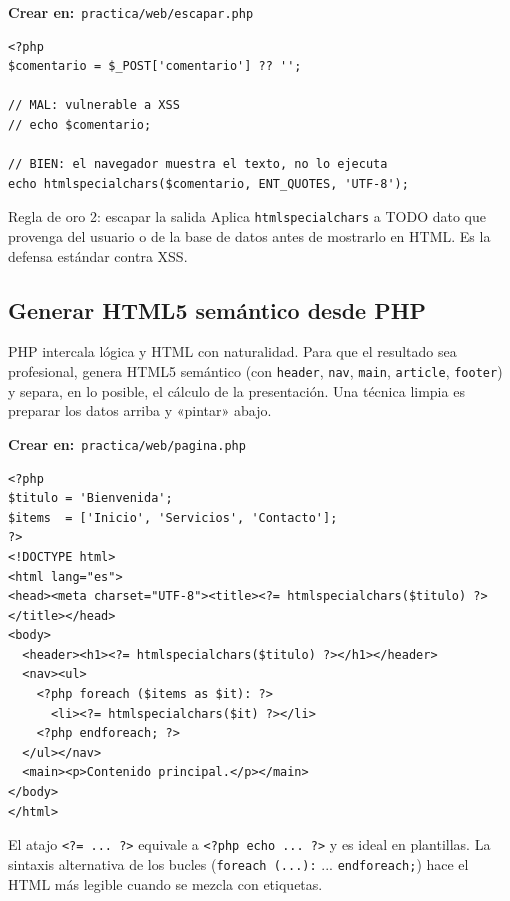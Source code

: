\documentclass[11pt]{article}
\begin{document}
{\small\color{phpazulo}\textbf{Crear en:}~}\texttt{practica/\allowbreak{}web/\allowbreak{}escapar.\allowbreak{}php}\par\nobreak\vspace{-1pt}
\begin{cajacodigo}
\begin{lstlisting}[style=php]
<?php
$comentario = $_POST['comentario'] ?? '';

// MAL: vulnerable a XSS
// echo $comentario;

// BIEN: el navegador muestra el texto, no lo ejecuta
echo htmlspecialchars($comentario, ENT_QUOTES, 'UTF-8');
\end{lstlisting}
\end{cajacodigo}
\vspace{2pt}
\begin{cajatip}{Regla de oro 2: escapar la salida}
Aplica \texttt{htmlspecialchars} a TODO dato que provenga del usuario o de la base de datos antes de mostrarlo en HTML. Es la defensa estándar contra XSS.\par
\end{cajatip}
\subsection{Generar HTML5 semántico desde PHP}
PHP intercala lógica y HTML con naturalidad. Para que el resultado sea profesional, genera HTML5 semántico (con \texttt{header}, \texttt{nav}, \texttt{main}, \texttt{article}, \texttt{footer}) y separa, en lo posible, el cálculo de la presentación. Una técnica limpia es preparar los datos arriba y «pintar» abajo.

{\small\color{phpazulo}\textbf{Crear en:}~}\texttt{practica/\allowbreak{}web/\allowbreak{}pagina.\allowbreak{}php}\par\nobreak\vspace{-1pt}
\begin{cajacodigo}
\begin{lstlisting}[style=php]
<?php
$titulo = 'Bienvenida';
$items  = ['Inicio', 'Servicios', 'Contacto'];
?>
<!DOCTYPE html>
<html lang="es">
<head><meta charset="UTF-8"><title><?= htmlspecialchars($titulo) ?></title></head>
<body>
  <header><h1><?= htmlspecialchars($titulo) ?></h1></header>
  <nav><ul>
    <?php foreach ($items as $it): ?>
      <li><?= htmlspecialchars($it) ?></li>
    <?php endforeach; ?>
  </ul></nav>
  <main><p>Contenido principal.</p></main>
</body>
</html>
\end{lstlisting}
\end{cajacodigo}
\vspace{2pt}
El atajo \texttt{\textless{}?\allowbreak{}=\allowbreak{} .\allowbreak{}.\allowbreak{}.\allowbreak{} ?\allowbreak{}\textgreater{}} equivale a \texttt{\textless{}?\allowbreak{}php echo .\allowbreak{}.\allowbreak{}.\allowbreak{} ?\allowbreak{}\textgreater{}} y es ideal en plantillas. La sintaxis alternativa de los bucles (\texttt{foreach (.\allowbreak{}.\allowbreak{}.\allowbreak{}):\allowbreak{}} ... \texttt{endforeach;\allowbreak{}}) hace el HTML más legible cuando se mezcla con etiquetas.
\end{document}
